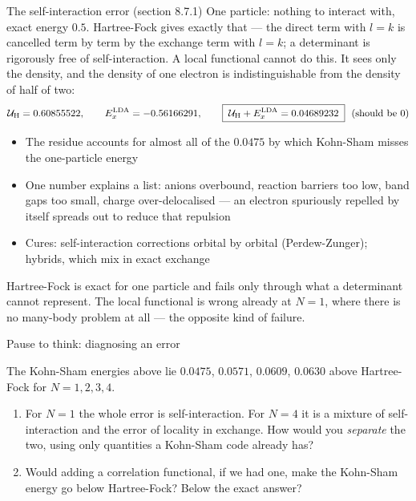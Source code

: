 \documentclass[aspectratio=169,10pt]{beamer}
\newcounter{thinkctr}
\newcommand{\thinkq}[2]{%
  \stepcounter{thinkctr}%
  \vfill
  \begin{tcolorbox}[enhanced,colback=palewarm,colframe=warm,boxrule=1.2pt,arc=4pt,
    grow to left by=6mm,grow to right by=6mm,
    left=16pt,right=16pt,top=16pt,bottom=18pt,
    fonttitle=\bfseries\Large,fontupper=\Large,
    title={Pause to think \#\thethinkctr\hfill\mdseries\normalsize(about #1 min -- discuss with your neighbour)}]
  #2
  \end{tcolorbox}
  \vfill}
\newcommand{\mbbox}[1]{%
  \begin{tcolorbox}[colback=paleblue,colframe=uioblue,title={\bfseries Many-body connection}]
  #1
  \end{tcolorbox}}
\begin{document}
\begin{frame}[shrink=8]{The self-interaction error (section 8.7.1)}
  \small
  One particle: nothing to interact with, exact energy $0.5$. Hartree-Fock gives exactly that --- the direct term with $l=k$ is cancelled term by term by the exchange term with $l=k$; \alert{a determinant is rigorously free of self-interaction}.
  \vspace{0.3em}
  A local functional cannot do this. It sees only the density, and the density of one electron is indistinguishable from the density of half of two:
  \[
    \mathcal U_{\rm H}=0.60855522,\qquad E_x^{\rm LDA}=-0.56166291,\qquad
    \boxed{\;\mathcal U_{\rm H}+E_x^{\rm LDA}=0.04689232\;}\ \ (\text{should be }0)
  \]
  \begin{itemize}
    \item The residue accounts for almost all of the $0.0475$ by which Kohn-Sham misses the one-particle energy
    \item One number explains a list: anions overbound, reaction barriers too low, band gaps too small, charge over-delocalised --- an electron spuriously repelled by itself spreads out to reduce that repulsion
    \item Cures: self-interaction corrections orbital by orbital (Perdew-Zunger); hybrids, which mix in exact exchange
  \end{itemize}
  \mbbox{Hartree-Fock is exact for one particle and fails only through what a determinant cannot represent. The local functional is wrong already at $N=1$, where there is no many-body problem at all --- the opposite kind of failure.}
\end{frame}

\begin{frame}{Pause to think: diagnosing an error}
  \thinkq{4}{
  The Kohn-Sham energies above lie $0.0475$, $0.0571$, $0.0609$, $0.0630$ above Hartree-Fock for $N=1,2,3,4$.
  \begin{enumerate}
    \item For $N=1$ the whole error is self-interaction. For $N=4$ it is a mixture of self-interaction and the error of locality in exchange. How would you \emph{separate} the two, using only quantities a Kohn-Sham code already has?
    \item Would adding a correlation functional, if we had one, make the Kohn-Sham energy go below Hartree-Fock? Below the exact answer?
  \end{enumerate}}
\end{frame}
\end{document}
